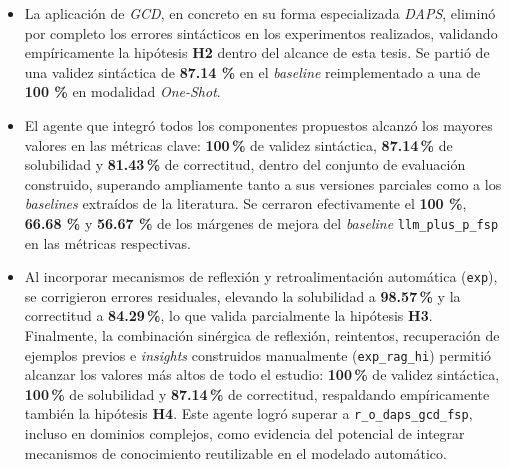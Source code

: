 \begin{conclusions}
\begin{itemize}
    \item La aplicación de \textit{GCD}, en concreto en su forma especializada \textit{DAPS}, eliminó por completo los errores sintácticos en los experimentos realizados, validando empíricamente la hipótesis \textbf{H2} dentro del alcance de esta tesis. Se partió de una validez sintáctica de \textbf{\textcolor[rgb]{0.0,0.87,0.0}{87.14 \%}} en el \textit{baseline} reimplementado a una de \textbf{\textcolor[rgb]{0.0,1.0,0.0}{100 \%}} en modalidad \textit{One-Shot}.

    \item El agente que integró todos los componentes propuestos alcanzó los mayores valores en las métricas clave: \textbf{\textcolor[rgb]{0.0,1.0,0.0}{100\,\%}} de validez sintáctica, \textbf{\textcolor[rgb]{0.0,0.87,0.0}{87.14\,\%}} de solubilidad y \textbf{\textcolor[rgb]{0.0,0.81,0.0}{81.43\,\%}} de correctitud, dentro del conjunto de evaluación construido, superando ampliamente tanto a sus versiones parciales como a los \textit{baselines} extraídos de la literatura. Se cerraron efectivamente el \textbf{\textcolor[rgb]{0.0,1.0,0.0}{100 \%}}, \textbf{\textcolor[rgb]{0.0,0.67,0.0}{66.68 \%}} y \textbf{\textcolor[rgb]{0.0,0.57,0.0}{56.67 \%}} de los márgenes de mejora del \textit{baseline} \texttt{llm\_plus\_p\_fsp} en las métricas respectivas.

    \item Al incorporar mecanismos de reflexión y retroalimentación automática (\texttt{exp}), se corrigieron errores residuales, elevando la solubilidad a \textbf{\textcolor[rgb]{0.0,0.94,0.0}{98.57\,\%}} y la correctitud a \textbf{\textcolor[rgb]{0.0,0.84,0.0}{84.29\,\%}}, lo que valida parcialmente la hipótesis \textbf{H3}. Finalmente, la combinación sinérgica de reflexión, reintentos, recuperación de ejemplos previos e \textit{insights} construidos manualmente (\texttt{exp\_rag\_hi}) permitió alcanzar los valores más altos de todo el estudio: \textbf{\textcolor[rgb]{0.0,1.0,0.0}{100\,\%}} de validez sintáctica, \textbf{\textcolor[rgb]{0.0,1.0,0.0}{100\,\%}} de solubilidad y \textbf{\textcolor[rgb]{0.0,0.87,0.0}{87.14\,\%}} de correctitud, respaldando empíricamente también la hipótesis \textbf{H4}. Este agente logró superar a \texttt{r\_o\_daps\_gcd\_fsp}, incluso en dominios complejos, como evidencia del potencial de integrar mecanismos de conocimiento reutilizable en el modelado automático.

\end{itemize}


\end{conclusions}

